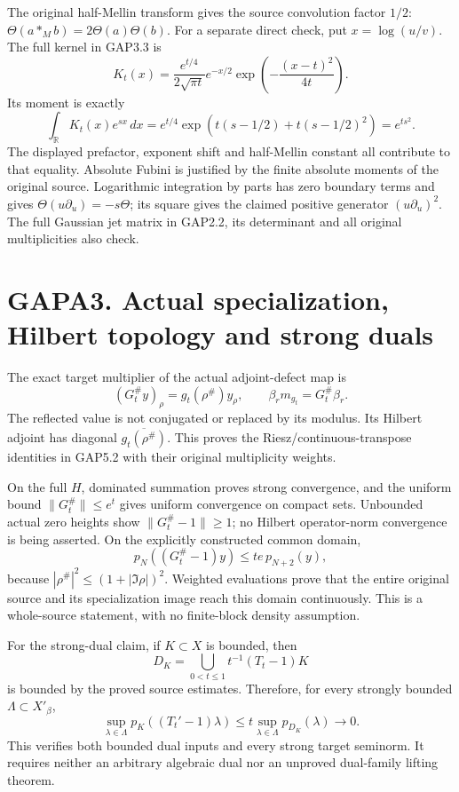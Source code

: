 The original half-Mellin transform gives the source convolution factor
\(1/2\): \(\Theta(a*_Mb)=2\Theta(a)\Theta(b)\). For a separate direct
check, put \(x=\log(u/v)\). The full kernel in GAP3.3 is \[
K_t(x)=\frac{e^{t/4}}{2\sqrt{\pi t}}
e^{-x/2}\exp\!\left(-\frac{(x-t)^2}{4t}\right).
\] Its moment is exactly \[
\int_{\mathbb R}K_t(x)e^{sx}\,dx
=e^{t/4}\exp\!\left(t(s-1/2)+t(s-1/2)^2\right)
=e^{ts^2}.
\tag{GAPA2.2}
\] The displayed prefactor, exponent shift and half-Mellin constant all
contribute to that equality. Absolute Fubini is justified by the finite
absolute moments of the original source. Logarithmic integration by
parts has zero boundary terms and gives
\(\Theta(u\partial_u)=-s\Theta\); its square gives the claimed positive
generator \((u\partial_u)^2\). The full Gaussian jet matrix in GAP2.2,
its determinant and all original multiplicities also check.

\section{GAPA3. Actual specialization, Hilbert topology and strong
duals}\label{gapa3.-actual-specialization-hilbert-topology-and-strong-duals}

The exact target multiplier of the actual adjoint-defect map is \[
(G_t^\#y)_\rho=g_t(\rho^\#)y_\rho,
\qquad \beta_rm_{g_t}=G_t^\#\beta_r.
\tag{GAPA3.1}
\] The reflected value is not conjugated or replaced by its modulus. Its
Hilbert adjoint has diagonal \(\overline{g_t(\rho^\#)}\). This proves
the Riesz/continuous-transpose identities in GAP5.2 with their original
multiplicity weights.

On the full \(H\), dominated summation proves strong convergence, and
the uniform bound \(\|G_t^\#\|\le e^t\) gives uniform convergence on
compact sets. Unbounded actual zero heights show \(\|G_t^\#-1\|\ge1\);
no Hilbert operator-norm convergence is being asserted. On the
explicitly constructed common domain, \[
p_N((G_t^\#-1)y)\le te\,p_{N+2}(y),
\tag{GAPA3.2}
\] because \(|\rho^\#|^2\le(1+|\Im\rho|)^2\). Weighted evaluations prove
that the entire original source and its specialization image reach this
domain continuously. This is a whole-source statement, with no
finite-block density assumption.

For the strong-dual claim, if \(K\subset X\) is bounded, then \[
D_K=\bigcup_{0<t\le1}t^{-1}(T_t-1)K
\] is bounded by the proved source estimates. Therefore, for every
strongly bounded \(\Lambda\subset X'_\beta\), \[
\sup_{\lambda\in\Lambda}p_K((T_t'-1)\lambda)
\le t\sup_{\lambda\in\Lambda}p_{D_K}(\lambda)\longrightarrow0.
\tag{GAPA3.3}
\] This verifies both bounded dual inputs and every strong target
seminorm. It requires neither an arbitrary algebraic dual nor an
unproved dual-family lifting theorem.

